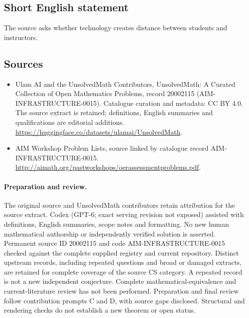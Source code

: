 \documentclass[11pt]{article}
\begin{document}
\subsection{Short English statement}
The source asks whether technology creates distance between students and instructors.
\subsection{Sources}
\begin{itemize}
\item[\hypertarget{source:20002115:1}{S1}] Ulam AI and the UnsolvedMath Contributors, UnsolvedMath: A Curated Collection of Open Mathematics Problems, record 20002115 (AIM-INFRASTRUCTURE-0015). Catalogue curation and metadata: CC BY 4.0. The source extract is retained; definitions, English summaries and qualifications are editorial additions.
\url{https://huggingface.co/datasets/ulamai/UnsolvedMath}.
\item[\hypertarget{source:20002115:2}{S2}] AIM Workshop Problem Lists, source linked by catalogue record AIM-INFRASTRUCTURE-0015.
\url{http://aimath.org/pastworkshops/oerassessmentproblems.pdf}.
\end{itemize}
\paragraph{Preparation and review.}
The original source and UnsolvedMath contributors retain attribution for the source extract. Codex (GPT-6; exact serving revision not exposed) assisted with definitions, English summaries, scope notes and formatting. No new human mathematical authorship or independently verified solution is asserted. Permanent source ID 20002115 and code AIM-INFRASTRUCTURE-0015 checked against the complete supplied registry and current repository. Distinct upstream records, including repeated questions and broad or damaged extracts, are retained for complete coverage of the source CS category. A repeated record is not a new independent conjecture. Complete mathematical-equivalence and current-literature review has not been performed. Preparation and final review follow contribution prompts C and D, with source gaps disclosed. Structural and rendering checks do not establish a new theorem or open status.
\label{end:20002115}
\end{document}
